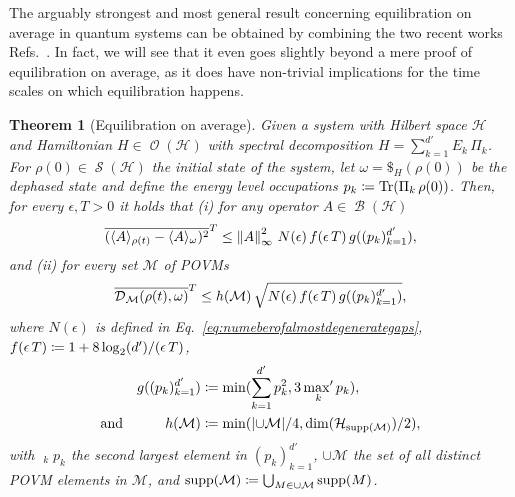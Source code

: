 \documentclass[a4paper,12pt,listof=totoc,index=totoc,bibliography=totoc,headsepline=false,headings=normal,BCOR16.153846mm,DIV12,headinclude,twoside,cleardoublepage=empty,numbers=noenddot,final]{scrreprt}
\theoremstyle{mystyle}
\numberwithin{equation}{section}
\numberwithin{figure}{section}
\numberwithin{lemma}{section}
\newtheorem{theorem}{Theorem}
\numberwithin{theorem}{section}
\numberwithin{corollary}{section}
\numberwithin{definition}{section}
\numberwithin{conjecture}{section}
\numberwithin{observation}{section}
\newcommand{\+}{\mkern2mu}
\newcommand{\coloneqq}{\mathrel{\vcentcolon\mkern-1.2mu=}} %
\newcommand{\union}{\cup}
\newcommand{\texteqref}[1]{Eq.~\eqref{#1}}
\renewcommand{\min}{\mathchoice{\operatorname*{min}}{\operatorname*{min}}{\mathrm{min}}{\mathrm{min}}}
\renewcommand{\H}{H}
\newcommand{\ex}[2]{\langle #1 \rangle_{#2}}
\newcommand{\norm}[2][]{
  \ifthenelse{\equal{#1}{}}
    {\left\| {#2} \right\|}
    {\ifthenelse{\equal{#1}{uinv}}
      {\left\vert\kern-0.25ex\left\vert\kern-0.25ex\left\vert {#2} \right\vert\kern-0.25ex\right\vert\kern-0.25ex\right\vert}
      {\left\| {#2} \right\|_{#1}}
    }
}
\newcommand{\taverage}[2][]{
  \ifthenelse{\equal{#1}{}}
  {\overline{#2}}
  {\overline{#2}^{#1}}
}
\newcommand{\tracedistance}[3][]{
  \ifthenelse{\equal{#2}{}}
  {\ifthenelse{\equal{#3}{}}
    {\mathcal{D}_{#1}}{}
  }{
    \ifthenelse{\equal{#1}{}}
    {\operatorname{\mathcal{D}}(#2,#3)}
    {\operatorname{\mathcal{D}}_{#1}(#2,#3)}
  }
}
\DeclareMathOperator*{\maxprime}{\mathrm{max}^\prime}
\DeclareMathOperator{\1}{\mathds{1}}
\newcommand{\POVMs}{\mathcal{M}}
\DeclareMathOperator{\Bop}{\mathcal{B}}
\DeclareMathOperator{\Obs}{\mathcal{O}}
\DeclareMathOperator{\Qst}{\mathcal{S}}
\DeclareMathOperator{\Tr}{Tr}
\DeclareMathOperator{\supp}{supp}
\newcommand{\mc}[1]{\mathcal{#1}}
\newcommand{\mcH}{\mc{H}}
\begin{document}
The arguably strongest and most general result concerning equilibration on average in quantum systems can be obtained by combining the two recent works Refs.~\cite{1110.5759v1,Reimann12}.
In fact, we will see that it even goes slightly beyond a mere proof of equilibration on average, as it does have non-trivial implications for the time scales on which equilibration happens.

\begin{theorem}[Equilibration on average] \label{thm:equilibrationonaverage}
  Given a system with Hilbert space $\mcH$ and Hamiltonian $\H \in \Obs(\mcH)$ with spectral decomposition $\H = \sum_{k=1}^{d'} E_k\,\Pi_k$.
  For $\rho(0) \in \Qst(\mcH)$ the initial state of the system, let $\omega = \$_H(\rho(0))$ be the dephased state and define the energy level occupations $p_k \coloneqq \Tr(\Pi_k\,\rho(0))$.
  Then, for every $\epsilon,T>0$ it holds that (i) for any operator $A \in \Bop(\mcH)$
  \begin{equation} \label{eq:equilibrationonaverageforexpectationvalues}
    \taverage[T]{( \ex A {\rho(t)} - \ex A \omega )^2} \leq \norm[\infty]{A}^2\,N(\epsilon)\,f(\epsilon\,T)\,g((p_k)_{k=1}^{d'})  ,
  \end{equation}
  and (ii) for every set $\POVMs$ of POVMs
  \begin{equation} \label{eq:equilibrationonaverageforrestricedpovms}
    \taverage[T]{\tracedistance[\POVMs]{\rho(t)}{\omega}} \leq h(\POVMs)\,\sqrt{N(\epsilon)\,f(\epsilon\,T)\,g((p_k)_{k=1}^{d'}) } ,
  \end{equation}
  where $N(\epsilon)$ is defined in \texteqref{eq:numeberofalmostdegenerategaps}, $f(\epsilon\,T) \coloneqq 1+8 \log_2(d')/(\epsilon\,T)$,
  \begin{align}
    && g((p_k)_{k=1}^{d'}) &\coloneqq \min(\sum_{k=1}^{d'} p_k^2, 3  \maxprime_k p_k ) ,\label{eq:equilibrationonaveraggeneralizedeffectivedimenson}\\
    \text{and}&& h(\POVMs) &\coloneqq \min(|{\union \POVMs}|/4, \dim(\mcH_{\supp(\POVMs)})/2 ) \label{eq:equilibrationonaveragnumberofmeasurements},
  \end{align}
  with $\maxprime_k p_k$ the second largest element in $(p_k)_{k=1}^{d'}$, $\union \POVMs$ the set of all distinct POVM elements in $\POVMs$, and $\supp(\POVMs) \coloneqq \bigcup_{M \in \union \POVMs} \supp(M)$.
\end{theorem}
\end{document}
